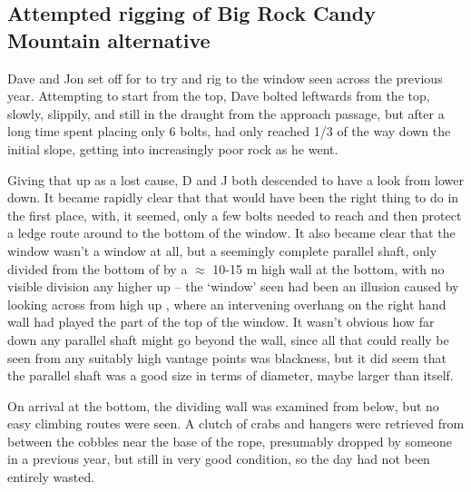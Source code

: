 \subsection{Attempted rigging of Big Rock Candy Mountain alternative}


Dave and Jon set off for to try and rig to the window seen across
 the previous year. Attempting to start
from the top, Dave bolted leftwards from the top, slowly, slippily, and
still in the draught from the approach passage, but after a long time
spent placing only 6 bolts, had only reached 1/3 of the way down the
initial slope, getting into increasingly poor rock as he went.

Giving that up as a lost cause, D and J both descended  to have a look from lower down. It became rapidly clear
that that would have been the right thing to do in the first place,
with, it seemed, only a few bolts needed to reach and then protect a
ledge route around to the bottom of the window. It also became clear
that the window wasn't a window at all, but a seemingly complete
parallel shaft, only divided from the bottom of  by a $\approx$ 10-15 m high wall at the bottom, with no
visible division any higher up -- the `window' seen had been an illusion
caused by looking across from high up ,
where an intervening overhang on the right hand wall had played the part
of the top of the window. It wasn't obvious how far down any parallel
shaft might go beyond the wall, since all that could really be seen from
any suitably high vantage points was blackness, but it did seem that the
parallel shaft was a good size in terms of diameter, maybe larger than
 itself.

On arrival at the bottom, the dividing wall was examined from below, but
no easy climbing routes were seen. A clutch of crabs and hangers were
retrieved from between the cobbles near the base of the rope, presumably
dropped by someone in a previous year, but still in very good condition,
so the day had not been entirely wasted.


